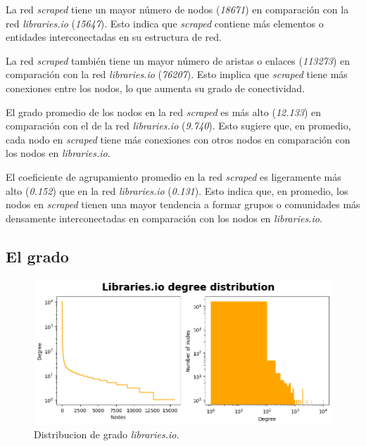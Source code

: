 La red \textit{scraped} tiene un mayor número de nodos (\textit{18671}) en comparación con la
red \textit{libraries.io} (\textit{15647}). Esto indica que \textit{scraped} contiene más elementos o entidades
interconectadas en su estructura de red.

La red \textit{scraped} también tiene un mayor número de aristas o enlaces (\textit{113273}) en
comparación con la red \textit{libraries.io} (\textit{76207}). Esto implica que \textit{scraped} tiene más
conexiones entre los nodos, lo que aumenta su grado de conectividad.

El grado promedio de los nodos en la red \textit{scraped} es más alto (\textit{12.133}) en
comparación con el de la red \textit{libraries.io} (\textit{9.740}). Esto sugiere que, en promedio, cada nodo
en \textit{scraped} tiene más conexiones con otros nodos en comparación con los nodos en \textit{libraries.io}.

El coeficiente de agrupamiento promedio en la red \textit{scraped} es
ligeramente más alto (\textit{0.152}) que en la red \textit{libraries.io} (\textit{0.131}). Esto indica que,
en promedio, los nodos en \textit{scraped} tienen una mayor tendencia a formar grupos o comunidades más densamente
interconectadas en comparación con los nodos en \textit{libraries.io}.

\subsection{El grado}

\begin{figure}[h!]
    \begin{center}
        \includegraphics[width=1\textwidth]{img/cran/distribucion_grado.png}
        \caption{Distribucion de grado \textit{libraries.io}.}
        \label{fig:cran_degree_distribution}
    \end{center}
\end{figure}

